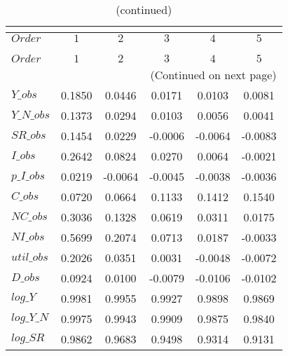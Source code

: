  
\begin{center}
\begin{longtable}{lccccc} 
\caption{COEFFICIENTS OF AUTOCORRELATION}\\
 \label{Table:th_autocorr_matrix}\\
\toprule 
$Order      $	 & 	 $         1$	 & 	 $         2$	 & 	 $         3$	 & 	 $         4$	 & 	 $         5$\\
\midrule \endfirsthead 
\caption{(continued)}\\
 \toprule \\ 
$Order      $	 & 	 $         1$	 & 	 $         2$	 & 	 $         3$	 & 	 $         4$	 & 	 $         5$\\
\midrule \endhead 
\midrule \multicolumn{6}{r}{(Continued on next page)} \\ \bottomrule \endfoot 
\bottomrule \endlastfoot 
$Y\_obs     $	 & 	    0.1850	 & 	    0.0446	 & 	    0.0171	 & 	    0.0103	 & 	    0.0081 \\ 
$Y\_N\_obs  $	 & 	    0.1373	 & 	    0.0294	 & 	    0.0103	 & 	    0.0056	 & 	    0.0041 \\ 
$SR\_obs    $	 & 	    0.1454	 & 	    0.0229	 & 	   -0.0006	 & 	   -0.0064	 & 	   -0.0083 \\ 
$I\_obs     $	 & 	    0.2642	 & 	    0.0824	 & 	    0.0270	 & 	    0.0064	 & 	   -0.0021 \\ 
$p\_I\_obs  $	 & 	    0.0219	 & 	   -0.0064	 & 	   -0.0045	 & 	   -0.0038	 & 	   -0.0036 \\ 
$C\_obs     $	 & 	    0.0720	 & 	    0.0664	 & 	    0.1133	 & 	    0.1412	 & 	    0.1540 \\ 
$NC\_obs    $	 & 	    0.3036	 & 	    0.1328	 & 	    0.0619	 & 	    0.0311	 & 	    0.0175 \\ 
$NI\_obs    $	 & 	    0.5699	 & 	    0.2074	 & 	    0.0713	 & 	    0.0187	 & 	   -0.0033 \\ 
$util\_obs  $	 & 	    0.2026	 & 	    0.0351	 & 	    0.0031	 & 	   -0.0048	 & 	   -0.0072 \\ 
$D\_obs     $	 & 	    0.0924	 & 	    0.0100	 & 	   -0.0079	 & 	   -0.0106	 & 	   -0.0102 \\ 
$log\_Y     $	 & 	    0.9981	 & 	    0.9955	 & 	    0.9927	 & 	    0.9898	 & 	    0.9869 \\ 
$log\_Y\_N  $	 & 	    0.9975	 & 	    0.9943	 & 	    0.9909	 & 	    0.9875	 & 	    0.9840 \\ 
$log\_SR    $	 & 	    0.9862	 & 	    0.9683	 & 	    0.9498	 & 	    0.9314	 & 	    0.9131 \\ 

\end{longtable}
\end{center}
